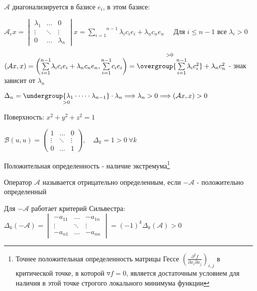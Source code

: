 \documentclass[12pt]{article}
\begin{document}
\begin{MyProof}
\begin{enumerate}
            $\mathcal{A}$ диагонализируется в базисе ${e_i}$, в этом базисе:
            
            $\mathcal{A}_e x =
            \begin{vmatrix}\lambda_{1} & \dots & 0 \\ \vdots & \ddots & \vdots \\ 0 & \dots & \lambda_{n}\end{vmatrix}x =
            \overset{n - 1}{\underset{i = 1}{\sum}}\lambda_i c_i e_i + \lambda_n c_n e_n \quad$ Для $i \leq n - 1$ все $\lambda_i > 0$

            $(\mathcal{A}x, x) = \left(\overset{n - 1}{\underset{i = 1}{\sum}} \lambda_i c_i e_i + \lambda_n c_n e_n,
            \overset{n - 1}{\underset{i = 1}{\sum}} c_i e_i\right) = \overset{> 0}{\overgroup{\overset{n - 1}{\underset{i = 1}{\sum}} \lambda_i c_i^2}} + \lambda_n c_n^2$ - знак зависит от $\lambda_n$
        \end{enumerate}

        $\Delta_n = \underset{> 0}{\undergroup{\lambda_1 \cdot \dots \cdot \lambda_{n-1}}} \cdot \lambda_n
        \Longrightarrow \lambda_n > 0 \Longrightarrow (\mathcal{A}x, x) > 0$

    \end{MyProof}

    \Ex Поверхность: $x^2 + y^2 + z^2 = 1$

    $\mathcal{B}(u, u) = \begin{pmatrix}1 & \dots & 0 \\ \vdots & \ddots & \vdots \\ 0 & \dots & 1\end{pmatrix},
    \quad \Delta_k = 1 > 0 \ \forall k$

    Положительная определенность - наличие экстремума\footnote{Точнее положительная определенность матрицы Гессе $\left(\frac{\partial^2 f}{\partial x_i \partial x_j}\right)_{i,j}$ в критической точке, в которой $\triangledown f = 0$, является достаточным условием для наличия в этой точке строгого локального минимума функции}

    \Def Оператор $\mathcal{A}$ называется отрицательно определенным, если $-\mathcal{A}$ - положительно определенный

    \Notas Для $-\mathcal{A}$ работает критерий Сильвестра: $\Delta_k(-\mathcal{A}) =
    \begin{vmatrix}-a_{11} & \dots & -a_{1n} \\ \vdots & \ddots & \vdots \\ -a_{n1} & \dots & -a_{nn}\end{vmatrix} = (-1)^k \Delta_k (\mathcal{A}) > 0$
\end{document}
